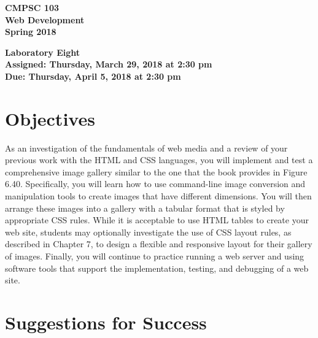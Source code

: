 \documentclass[11pt]{article}
\newcommand{\assignmentduedate}{April 5}
\newcommand{\assignmentassignedate}{March 29}
\newcommand{\assignmentnumber}{Eight}
\newcommand{\labyear}{2018}
\newcommand{\labday}{Thursday}
\newcommand{\labtime}{2:30 pm}
\newcommand{\assigneddate}{Assigned: \labday, \assignmentassignedate, \labyear{} at \labtime{}}
\newcommand{\duedate}{Due: \labday, \assignmentduedate, \labyear{} at \labtime{}}
\newcommand{\labtitle}[1]
{
  \begin{center}
    \begin{center}
      \bf
      CMPSC 103\\Web Development\\
      Spring 2018\\
      \medskip
    \end{center}
    \bf
    #1
  \end{center}
}
\begin{document}
\thispagestyle{empty}

\labtitle{Laboratory \assignmentnumber{} \\ \assigneddate{} \\ \duedate{}}

\section*{Objectives}

As an investigation of the fundamentals of web media and a review of your
previous work with the HTML and CSS languages, you will implement and test a
comprehensive image gallery similar to the one that the book provides in Figure
6.40. Specifically, you will learn how to use command-line image conversion and
manipulation tools to create images that have different dimensions. You will
then arrange these images into a gallery with a tabular format that is styled by
appropriate CSS rules. While it is acceptable to use HTML tables to create your
web site, students may optionally investigate the use of CSS layout rules, as
described in Chapter 7, to design a flexible and responsive layout for their
gallery of images. Finally, you will continue to practice running a web server
and using software tools that support the implementation, testing, and debugging
of a web site.

\section*{Suggestions for Success}
\end{document}
